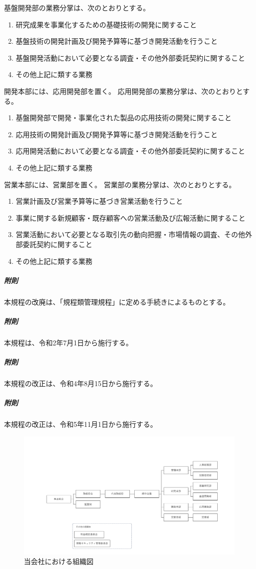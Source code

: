 \documentclass[10pt,a4paper,uplatex,dvipdfmx]{jsarticle}
\begin{document}
\term 基盤開発部の業務分掌は、次のとおりとする。
\begin{enumerate}
	\item 研究成果を事業化するための基礎技術の開発に関すること
	\item 基盤技術の開発計画及び開発予算等に基づき開発活動を行うこと
	\item 基盤開発活動において必要となる調査・その他外部委託契約に関すること
	\item その他上記に類する業務
\end{enumerate}

開発本部には、応用開発部を置く。
\term 応用開発部の業務分掌は、次のとおりとする。
\begin{enumerate}
	\item 基盤開発部で開発・事業化された製品の応用技術の開発に関すること
	\item 応用技術の開発計画及び開発予算等に基づき開発活動を行うこと
	\item 応用開発活動において必要となる調査・その他外部委託契約に関すること
	\item その他上記に類する業務
\end{enumerate}

営業本部には、営業部を置く。
\term 営業部の業務分掌は、次のとおりとする。
\begin{enumerate}
	\item 営業計画及び営業予算等に基づき営業活動を行うこと
	\item 事業に関する新規顧客・既存顧客への営業活動及び広報活動に関すること
	\item 営業活動において必要となる取引先の動向把握・市場情報の調査、その他外部委託契約に関すること
	\item その他上記に類する業務
\end{enumerate}

\vspace{1cm}
\subparagraph{附則}本規程の改廃は、「規程類管理規程」に定める手続きによるものとする。
\subparagraph{附則}本規程は、令和2年7月1日から施行する。
\subparagraph{附則}本規程の改正は、令和4年8月15日から施行する。
\subparagraph{附則}本規程の改正は、令和5年11月1日から施行する。

\clearpage

\begin{figure}[h]
\centering
	\includegraphics[trim={1cm 0cm 1cm 0cm},clip,width=1.0\linewidth]{figs/soshiki.pdf}
\caption{当会社における組織図}
\label{fig:soshiki}
\end{figure}
\end{document}
